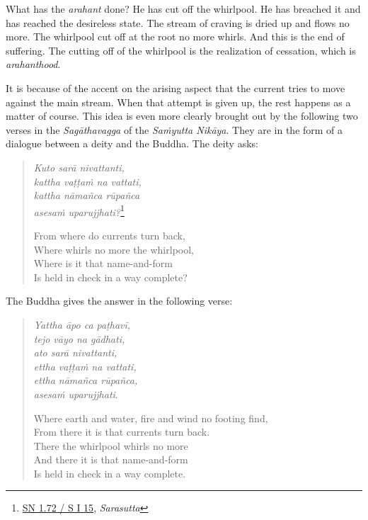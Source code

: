 What has the \emph{arahant} done? He has cut off the whirlpool. He has breached it and has reached the desireless state. The stream of craving is dried up and flows no more. The whirlpool cut off at the root no more whirls. And this is the end of suffering. The cutting off of the whirlpool is the realization of cessation, which is \emph{arahanthood}.

It is because of the accent on the arising aspect that the current tries to move against the main stream. When that attempt is given up, the rest happens as a matter of course. This idea is even more clearly brought out by the following two verses in the \emph{Sagāthavagga} of the \emph{Saṁyutta Nikāya}. They are in the form of a dialogue between a deity and the Buddha. The deity asks:

\begin{quote}
\emph{Kuto sarā nivattanti,}\\
\emph{kattha vaṭṭaṁ na vattati,}\\
\emph{kattha nāmañca rūpañca}\\
\emph{asesaṁ uparujjhati?}\footnote{\href{https://suttacentral.net/sn1.72/pli/ms}{SN 1.72 / S I 15}, \emph{Sarasutta}}

From where do currents turn back,\\
Where whirls no more the whirlpool,\\
Where is it that name-and-form\\
Is held in check in a way complete?
\end{quote}

The Buddha gives the answer in the following verse:

\begin{quote}
\emph{Yattha āpo ca paṭhavī,}\\
\emph{tejo vāyo na gādhati,}\\
\emph{ato sarā nivattanti,}\\
\emph{ettha vaṭṭaṁ na vattati,}\\
\emph{ettha nāmañca rūpañca,}\\
\emph{asesaṁ uparujjhati}.

Where earth and water, fire and wind no footing find,\\
From there it is that currents turn back.\\
There the whirlpool whirls no more\\
And there it is that name-and-form\\
Is held in check in a way complete.
\end{quote}

